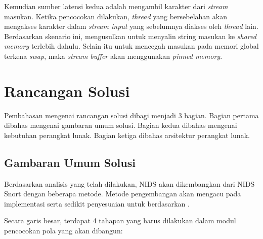       Kemudian sumber latensi kedua adalah mengambil karakter dari \emph{stream} masukan. Ketika pencocokan dilakukan, \emph{thread} yang bersebelahan akan mengakses karakter dalam \emph{stream input} yang sebelumnya diakses oleh \emph{thread} lain. Berdasarkan skenario ini, \cite{lin2013} mengusulkan untuk menyalin string masukan ke \emph{shared memory} terlebih dahulu. Selain itu untuk mencegah masukan pada memori global terkena \emph{swap}, maka \emph{stream buffer} akan menggunakan \emph{pinned memory}. 

  \section{Rancangan Solusi}

    Pembahasan mengenai rancangan solusi dibagi menjadi 3 bagian. Bagian pertama dibahas mengenai gambaran umum solusi. Bagian kedua dibahas mengenai kebutuhan perangkat lunak. Bagian ketiga dibahas arsitektur perangkat lunak. 

    \subsection{Gambaran Umum Solusi}

      Berdasarkan analisis yang telah dilakukan, NIDS akan dikembangkan dari NIDS Snort dengan beberapa metode. Metode pengembangan akan mengacu pada implementasi \cite{lin2013} serta sedikit penyesuaian untuk berdasarkan \cite{gnort2008}.
      

      Secara garis besar, terdapat 4 tahapan yang harus dilakukan dalam modul pencocokan pola yang akan dibangun:

